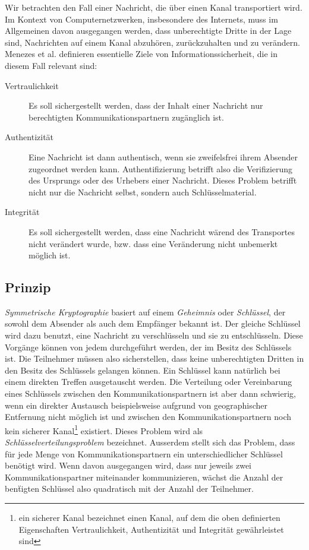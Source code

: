 Wir betrachten den Fall einer Nachricht, die \"uber einen Kanal
transportiert wird. Im Kontext von Computernetzwerken, insbesondere
des Internets, muss im Allgemeinen davon ausgegangen werden, dass
unberechtigte Dritte in der Lage sind, Nachrichten auf einem Kanal
abzuh\"oren, zur\"uckzuhalten und zu ver\"andern. Menezes et
al. \cite{Menezes1996} definieren essentielle Ziele von
Informationssicherheit, die in diesem Fall relevant sind:

\begin{description}
\item[Vertraulichkeit] Es soll sichergestellt werden, dass der Inhalt
  einer Nachricht nur berechtigten Kommunikationspartnern zug\"anglich
  ist.
\item[Authentizit\"at] Eine Nachricht ist dann authentisch, wenn sie
  zweifelsfrei ihrem Absender zugeordnet werden
  kann. Authentifizierung betrifft also die Verifizierung des
  Ursprungs oder des Urhebers einer Nachricht. Dieses Problem betrifft
  nicht nur die Nachricht selbst, sondern auch Schl\"usselmaterial.
\item[Integrit\"at] Es soll sichergestellt werden, dass eine Nachricht
  w\"arend des Transportes nicht ver\"andert wurde, bzw. dass eine
  Ver\"anderung nicht unbemerkt m\"oglich ist.
\end{description}

\subsection{Prinzip}
\label{ch:Grundlagen:sec:PublicKeyCrypto:subsec:Prinzip}

\emph{Symmetrische Kryptographie} basiert auf einem \emph{Geheimnis}
oder \emph{Schl\"ussel}, der sowohl dem Absender als auch dem
Empf\"anger bekannt ist. Der gleiche Schl\"ussel wird dazu benutzt,
eine Nachricht zu verschl\"usseln und sie zu entschl\"usseln. Diese
Vorg\"ange k\"onnen von jedem durchgef\"uhrt werden, der im Besitz des
Schl\"ussels ist.  Die Teilnehmer m\"ussen also sicherstellen, dass
keine unberechtigten Dritten in den Besitz des Schl\"ussels gelangen
k\"onnen. Ein Schl\"ussel kann nat\"urlich bei einem direkten Treffen
ausgetauscht werden. Die Verteilung oder Vereinbarung eines
Schl\"ussels zwischen den Kommunikationspartnern ist aber dann
schwierig, wenn ein direkter Austausch beispielsweise aufgrund von
geographischer Entfernung nicht m\"oglich ist und zwischen den
Kommunikationspartnern noch kein sicherer Kanal\footnote{ein sicherer
  Kanal bezeichnet einen Kanal, auf dem die oben definierten
  Eigenschaften Vertraulichkeit, Authentizit\"at und Integrit\"at
  gew\"ahrleistet sind} existiert. Dieses Problem wird als
\emph{Schl\"usselverteilungsproblem} bezeichnet\cite{Menezes1996}.
Ausserdem stellt sich das Problem, dass f\"ur jede Menge von
Kommunikationspartnern ein unterschiedlicher Schl\"ussel ben\"otigt
wird. Wenn davon ausgegangen wird, dass nur jeweils zwei
Kommunikationspartner miteinander kommunizieren, w\"achst die Anzahl
der ben\"tigten Schl\"ussel also quadratisch mit der Anzahl der
Teilnehmer.


